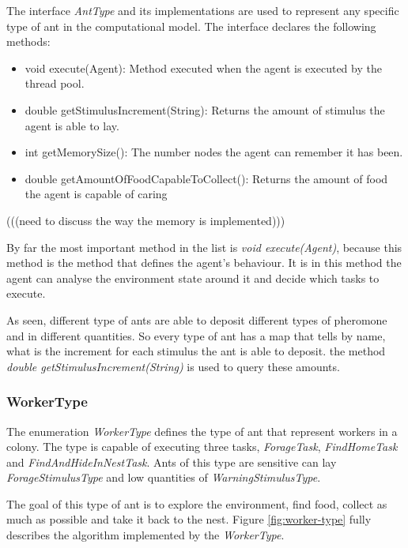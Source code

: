 The interface \emph{AntType} and its implementations are used to represent any specific type of ant in the computational model. The interface declares the following methods:

\begin{itemize}

  \item void execute(Agent): Method executed when the agent is executed by the thread pool.
  \item double getStimulusIncrement(String): Returns the amount of stimulus the agent is able to lay.
  \item int getMemorySize(): The number nodes the agent can remember it has been.
  \item double getAmountOfFoodCapableToCollect(): Returns the amount of food the agent is capable of caring 

\end{itemize}

(((need to discuss the way the memory is implemented)))

By far the most important method in the list is \emph{void execute(Agent)}, because this method is the method that defines the agent's behaviour. It is in this method the agent can analyse the environment state around it and decide which tasks to execute.

As seen, different type of ants are able to deposit different types of pheromone and in different quantities. So every type of ant has a map that tells by name, what is the increment for each stimulus the ant is able to deposit. the method \emph{double getStimulusIncrement(String)} is used to query these amounts.

\subsubsection{WorkerType}

The enumeration \emph{WorkerType} defines the type of ant that represent workers in a colony. The type is capable of executing three tasks, \emph{ForageTask}, \emph{FindHomeTask} and \emph{FindAndHideInNestTask}. Ants of this type are sensitive can lay \emph{ForageStimulusType} and low quantities of \emph{WarningStimulusType}. 

The goal of this type of ant is to explore the environment, find food,  collect as much as possible and take it back to the nest. Figure \ref{fig:worker-type} fully describes the algorithm implemented by the \emph{WorkerType}.

